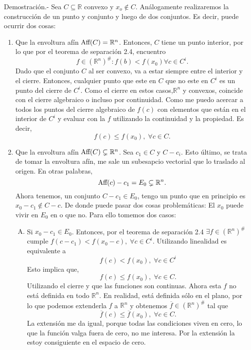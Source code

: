 \begin{paracol}{2}
\begin{teo}
    Demostración.-\; Sea $C\subseteq \mathbb{R}$ convexo y $x_o\notin C$. Análogamente realizaremos la construcción de un punto y conjunto y luego de dos conjuntos. Es decir, puede ocurrir dos cosas:
    \begin{enumerate}[1.]
	\item Que la envoltura afín $\mathop{\mbox{\normalfont Aff}}\nolimits(C)=\mathbb{R}^n$. Entonces, $C$ tiene un punto interior, por lo que por el teorema de separación 2.4, encuentro 
	    $$f\in (\mathbb{R}^n)^\#: f(b)<f(x_0) \forall c\in C^i.$$
	    Dado que el conjunto $C$ al ser convexo, va a estar siempre entre el interior y el cierre. Entonces, cualquier punto que este en $C$ que no este en $C^i$ es un punto del cierre de $C^i$. Como el cierre en estos casos,$\mathbb{R}^n$ y convexos, coincide con el cierre algebraico o incluso por continuidad. Como me puedo acercar a todos los puntos del cierre algebraico de $f(c)$ con elementos que están en el interior de $C^i$ y evaluar con la $f$ utilizando la continuidad y la propiedad. Es decir,
	    $$f(c)\leq f(x_0),\; \forall c\in C.$$
	\item Que la envoltura afín $\mathop{\mbox{\normalfont Aff}}\nolimits(C)\subsetneq \mathbb{R}^n$. Sea $c_1\in C$ y $C-c_i$. Esto último, se trata de tomar la envoltura afín, me sale un subesapcio vectorial que lo traslado al origen. En otras palabras, 
	    $$\mathop{\mbox{\normalfont Aff}}\nolimits(c)-c_1=E_0\subsetneq \mathbb{R}^n.$$
	    Ahora tenemos, un conjunto $C-c_1\in E_0$, tengo un punto que en principio es $x_0-c_1\notin C-c$. De donde puede pasar dos cosas problemáticas: El $x_0$ puede vivir en $E_0$ en o que no. Para ello tomemos dos casos:
	    \begin{enumerate}[A)]
	    \item  Si  $x_0-c_1\in E_0$. Entonces, por el teorema de separación 2.4 $\exists f\in \left(\mathbb{R}^n\right)^\#$ cumple $f(c-c_1)<f(x_0-c),\; \forall c\in C^i$. Utilizando linealidad es equivalente a 
		    $$f(c)<f(x_0),\; \forall c\in C^i$$
		    Esto implica que,
		    $$f(c)\leq f(x_0),\; \forall c\in C.$$
		    Utilizando el cierre y que las funciones son continuas. Ahora esta $f$ no está definida en todo $\mathbb{R}^n$. En realidad, está definida sólo en el plano, por lo que podemos extenderla $f$ a $\mathbb{R}^n$ y obtenemos $\overline{f}\in \left(\mathbb{R}^n\right)^\#$ tal que 
		    $$\overline{f}(c)\leq \overline{f}(x_0),\; \forall c\in C.$$
		    La extensión me da igual, porque todas las condiciones viven en cero, lo que la función valga fuera de cero, no me interesa. Por la extensión la estoy consiguiente en el espacio de cero.
		    \begin{center}

\end{center}
\end{enumerate}
\end{enumerate}
\end{teo}
\end{paracol}
